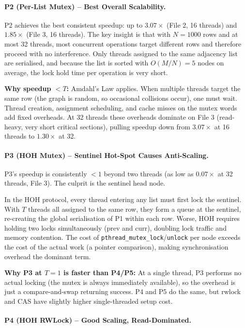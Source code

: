 \documentclass{article}
\begin{document}
\paragraph{P2 (Per-List Mutex) -- Best Overall Scalability.}

P2 achieves the best consistent speedup: up to $3.07\times$ (File 2, 16 threads)
and $1.85\times$ (File 3, 16 threads). The key insight is that with $N = 1000$
rows and at most 32 threads, most concurrent operations target different rows
and therefore proceed with no interference. Only threads assigned to the same
adjacency list are serialised, and because the list is sorted with
$O(M/N) = 5$ nodes on average, the lock hold time per operation is very short.

\textbf{Why speedup $< T$:} Amdahl's Law applies. When multiple threads target
the same row (the graph is random, so occasional collisions occur), one must wait.
Thread creation, assignment scheduling, and cache misses on the mutex words add
fixed overheads. At 32 threads these overheads dominate on File 3 (read-heavy,
very short critical sections), pulling speedup down from $3.07\times$ at
16 threads to $1.30\times$ at 32.

\paragraph{P3 (HOH Mutex) -- Sentinel Hot-Spot Causes Anti-Scaling.}

P3's speedup is consistently $< 1$ beyond two threads (as low as $0.07\times$
at 32 threads, File 3). The culprit is the sentinel head node.

In the HOH protocol, every thread entering any list must first lock the sentinel.
With $T$ threads all assigned to the same row, they form a queue at the sentinel,
re-creating the global serialisation of P1 within each row. Worse, HOH requires
holding two locks simultaneously (prev and curr), doubling lock traffic and
memory contention. The cost of \texttt{pthread\_mutex\_lock}/\texttt{unlock}
per node exceeds the cost of the actual work (a pointer comparison),
making synchronisation overhead the dominant term.

\textbf{Why P3 at $T=1$ is faster than P4/P5:}
At a single thread, P3 performs no actual locking (the mutex is always
immediately available), so the overhead is just a compare-and-swap
returning success. P4 and P5 do the same, but rwlock and CAS have
slightly higher single-threaded setup cost.

\paragraph{P4 (HOH RWLock) -- Good Scaling, Read-Dominated.}
\end{document}
